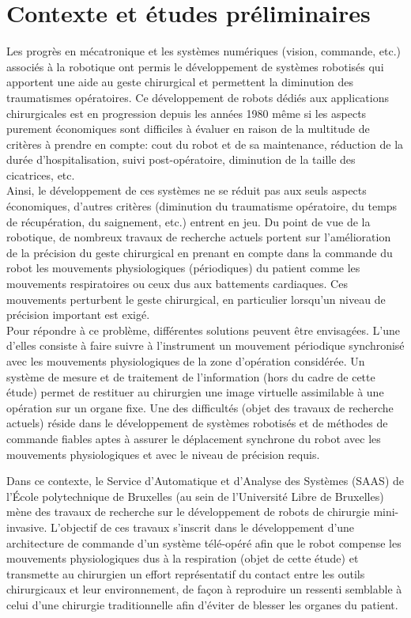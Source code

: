 \section{Contexte et études préliminaires}
Les progrès en mécatronique et les systèmes numériques (vision, commande, etc.) associés à la robotique ont permis le développement de systèmes robotisés qui apportent une aide au geste chirurgical et permettent la diminution des traumatismes opératoires. Ce développement de robots dédiés aux applications chirurgicales est en progression depuis les années 1980 même si les aspects purement économiques sont difficiles à évaluer en raison de la multitude de critères à prendre en compte: cout du robot et de sa maintenance, réduction de la durée d'hospitalisation, suivi post-opératoire, diminution de la taille des cicatrices, etc.\\
Ainsi, le développement de ces systèmes ne se réduit pas aux seuls aspects économiques, d'autres critères (diminution du traumatisme opératoire, du temps de récupération, du saignement, etc.) entrent en jeu. Du point de vue de la robotique, de nombreux travaux de recherche actuels portent sur l'amélioration de la précision du geste chirurgical en prenant en compte dans la commande du robot les mouvements physiologiques (périodiques) du patient comme les mouvements respiratoires ou ceux dus aux battements cardiaques. Ces mouvements perturbent le geste chirurgical, en particulier lorsqu'un niveau de précision important est exigé.\\
Pour répondre à ce problème, différentes solutions peuvent être envisagées. L'une d'elles consiste à faire suivre à l'instrument un mouvement périodique synchronisé avec les mouvements physiologiques de la zone d'opération considérée. Un système de mesure et de traitement de l'information (hors du cadre de cette étude) permet de restituer au chirurgien une image virtuelle assimilable à une opération sur un organe fixe. Une des difficultés (objet des travaux de recherche actuels) réside dans le développement de systèmes robotisés et de méthodes de commande fiables aptes à assurer le déplacement synchrone du robot avec les mouvements physiologiques et avec le niveau de précision requis.

Dans ce contexte, le Service d'Automatique et d'Analyse des Systèmes (SAAS) de l'École polytechnique de Bruxelles (au sein de l'Université Libre de Bruxelles) mène des travaux de recherche sur le développement de robots de chirurgie mini-invasive. L'objectif de ces travaux s'inscrit dans le développement d'une architecture de commande d'un système télé-opéré afin que le robot compense les mouvements physiologiques dus à la respiration (objet de cette étude) et transmette au chirurgien un effort représentatif du contact entre les outils chirurgicaux et leur environnement, de façon à reproduire un ressenti semblable à celui d'une chirurgie traditionnelle afin d'éviter de blesser les organes du patient.

